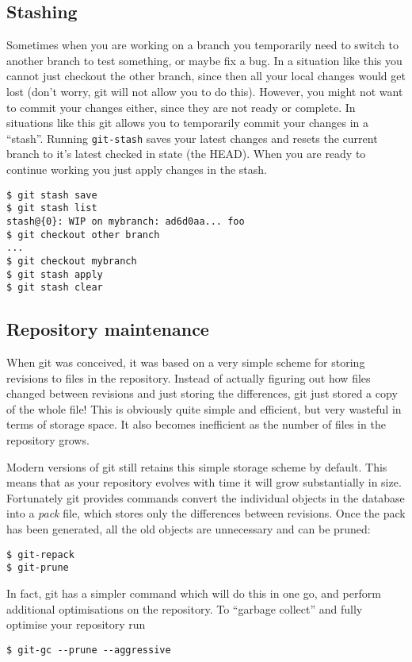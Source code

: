 \documentclass[a4paper,10pt]{article}
\begin{document}
\subsection{Stashing}
Sometimes when you are working on a branch you temporarily need to switch to
another branch to test something, or maybe fix a bug. In a situation like this
you cannot just checkout the other branch, since then all your local changes
would get lost (don't worry, git will not allow you to do this). However, you
might not want to commit your changes either, since they are not ready or
complete. In situations like this git allows you to temporarily commit your
changes in a ``stash''. Running \texttt{git-stash} saves your latest changes
and resets the current branch to it's latest checked in state (the HEAD). When
you are ready to continue working you just apply changes in the stash.
\begin{verbatim}
$ git stash save
$ git stash list
stash@{0}: WIP on mybranch: ad6d0aa... foo
$ git checkout other branch
...
$ git checkout mybranch
$ git stash apply
$ git stash clear
\end{verbatim}


\subsection{Repository maintenance}
When git was conceived, it was based on a very simple scheme for storing
revisions to files in the repository. Instead of actually figuring out how
files changed between revisions and just storing the differences, git just
stored a copy of the whole file! This is obviously quite simple and efficient,
but very wasteful in terms of storage space. It also becomes inefficient as
the number of files in the repository grows. 

Modern versions of git still retains this simple storage scheme by default.
This means that as your repository evolves with time it will grow
substantially in size. Fortunately git provides commands convert the
individual objects in the database into a \emph{pack} file, which stores only
the differences between revisions. Once the pack has been generated, all the
old objects are unnecessary and can be pruned:
\begin{verbatim}
$ git-repack
$ git-prune
\end{verbatim}
In fact, git has a simpler command which will do this in one go, and
perform additional optimisations on the repository. To ``garbage collect'' and
fully optimise your repository run
\begin{verbatim}
$ git-gc --prune --aggressive
\end{verbatim}
\end{document}
